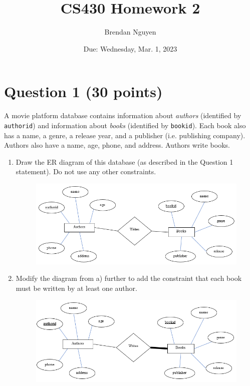 \documentclass[letterpaper, 11pt]{article}
\title{CS430 Homework 2}
\author{Brendan Nguyen}
\date{Due: Wednesday, Mar. 1, 2023}
\begin{document}
\maketitle

\section*{Question 1 (30 points)}

A movie platform database contains information about \textit{authors} (identified by \texttt{authorid}) and information about \textit{books} (identified by \texttt{bookid}). Each book also has a name, a genre, a release year, and a publisher (i.e. publishing company). Authors also have a name, age, phone, and address. Authors write books.

\begin{enumerate}[label={\alph*}),leftmargin=*]
    \item Draw the ER diagram of this database (as described in the Question 1 statement). Do not use any other constraints.
    \begin{figure}[H]
        \centering
        \includegraphics[scale=0.7]{hw2-1a.png}
    \end{figure}
    \item Modify the diagram from a) further to add the constraint that each book must be written by at least one author.
    \begin{figure}[H]
        \centering
        \includegraphics[scale=0.7]{hw2-1b.png}

\end{figure}
\end{enumerate}
\end{document}
